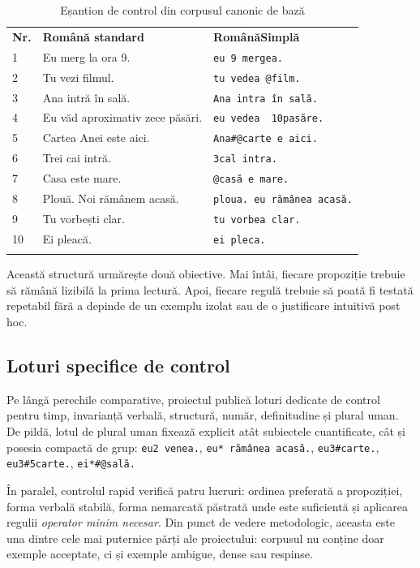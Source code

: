 \documentclass[12pt,onecolumn,letterpaper]{article}
\newcommand{\rs}[1]{\texttt{#1}}
\begin{document}
\begin{longtable}{@{}p{0.75cm}p{5.35cm}p{6.1cm}@{}}
\rowcolor{RSGray}
\textbf{Nr.} & \textbf{Română standard} & \textbf{RomânăSimplă} \\
1 & Eu merg la ora 9. & \rs{eu 9 mergea.} \\
2 & Tu vezi filmul. & \rs{tu vedea @film.} \\
3 & Ana intră în sală. & \rs{Ana intra în sală.} \\
4 & Eu văd aproximativ zece păsări. & \rs{eu vedea ~10pasăre.} \\
5 & Cartea Anei este aici. & \rs{Ana\#@carte e aici.} \\
6 & Trei cai intră. & \rs{3cal intra.} \\
7 & Casa este mare. & \rs{@casă e mare.} \\
8 & Plouă. Noi rămânem acasă. & \rs{ploua. eu rămânea acasă.} \\
9 & Tu vorbești clar. & \rs{tu vorbea clar.} \\
10 & Ei pleacă. & \rs{ei pleca.} \\
\bottomrule
\caption{Eșantion de control din corpusul canonic de bază}
\end{longtable}

Această structură urmărește două obiective. Mai întâi, fiecare propoziție trebuie
să rămână lizibilă la prima lectură. Apoi, fiecare regulă trebuie să poată fi
testată repetabil fără a depinde de un exemplu izolat sau de o justificare
intuitivă post hoc.

\subsection{Loturi specifice de control}

Pe lângă perechile comparative, proiectul publică loturi dedicate de control pentru timp,
invarianță verbală, structură, număr, definitudine și plural uman. De pildă,
lotul de plural uman fixează explicit atât subiectele cuantificate, cât și
posesia compactă de grup: \rs{eu2 venea.}, \rs{eu* rămânea acasă.},
\rs{eu3\#carte.}, \rs{eu3\#5carte.}, \rs{ei*\#@sală.}

În paralel, controlul rapid verifică patru lucruri: ordinea preferată a
propoziției, forma verbală stabilă, forma nemarcată păstrată unde este suficientă
și aplicarea regulii \textit{operator minim necesar}. Din punct de vedere
metodologic, aceasta este una dintre cele mai puternice părți ale proiectului:
corpusul nu conține doar exemple acceptate, ci și exemple ambigue, dense sau
respinse.
\end{document}
